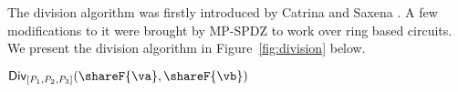 \label{subsec:division}




The division algorithm was firstly introduced by Catrina and Saxena \cite{FC:CatSax10}.
A few modifications to it were brought by MP-SPDZ to work over ring based circuits.
We present the division algorithm in Figure~\ref{fig:division} below.

\msubsubsection
  {$\mathsf{Div}_{[P_1, P_2, P_3]}(\shareF{\va}, \shareF{\vb})$}
  \label{fig:division}

